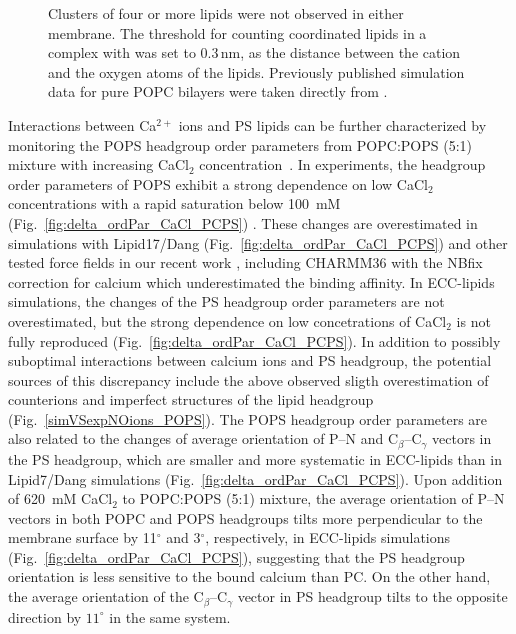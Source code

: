 \documentclass[journal=jpcbfk,manuscript=article]{achemso}
\begin{document}
\begin{figure}[tbp!]
{    %
    Clusters of four or more lipids were not observed in either membrane.
    The threshold for counting coordinated lipids in a complex with  was set to $0.3\,\mathrm{nm}$, 
    as the distance between the cation and the oxygen atoms of the lipids. 
    Previously published simulation data \cite{melcr18} for pure POPC bilayers were taken directly from \cite{ECC-POPC_nacl_cacl2_files}. 
  }
   \\
\end{figure} 

Interactions between Ca$^{2+}$ ions and PS lipids can be further characterized by monitoring
the POPS headgroup order parameters from POPC:POPS (5:1) mixture with increasing  CaCl$_2$ concentration~\cite{roux90}.
In experiments, the headgroup order parameters of POPS exhibit a strong dependence
on low CaCl$_2$ concentrations with a rapid saturation below 100~mM  (Fig.~\ref{fig:delta_ordPar_CaCl_PCPS}) \cite{roux90}.
These changes are overestimated in simulations with Lipid17/Dang (Fig.~\ref{fig:delta_ordPar_CaCl_PCPS})
and other tested force fields in our recent work \cite{NMRlipidsIV}, 
including CHARMM36 with the NBfix correction for calcium
which underestimated the binding affinity.
In ECC-lipids simulations, the changes of the PS headgroup order parameters are not overestimated,
but the strong dependence on low concetrations of CaCl$_2$ is not fully reproduced (Fig.~\ref{fig:delta_ordPar_CaCl_PCPS}).
In addition to possibly suboptimal interactions between calcium ions and PS headgroup, the potential sources of this
discrepancy include the above observed sligth overestimation of  counterions and
imperfect structures of the lipid headgroup (Fig.~\ref{simVSexpNOions_POPS}).
The POPS headgroup order parameters are also related to the changes of average orientation of P--N and
C$_{\beta}$--C$_{\gamma}$ vectors in the PS headgroup, which are smaller and more systematic
in ECC-lipids than in Lipid7/Dang simulations (Fig.~\ref{fig:delta_ordPar_CaCl_PCPS}).
Upon addition of 620~mM CaCl$_2$ to POPC:POPS (5:1) mixture,
the average orientation of P--N vectors in both POPC and POPS headgroups tilts more perpendicular to the membrane surface
by 11$^\circ$ and  3$^\circ$, respectively, in ECC-lipids simulations (Fig.~\ref{fig:delta_ordPar_CaCl_PCPS}),
suggesting that the PS headgroup orientation is less sensitive to the bound calcium than PC.
On the other hand, the average orientation of the C$_{\beta}$--C$_{\gamma}$ vector in PS headgroup
tilts to the opposite direction by $11^\circ$ in the same system.
\end{document}
